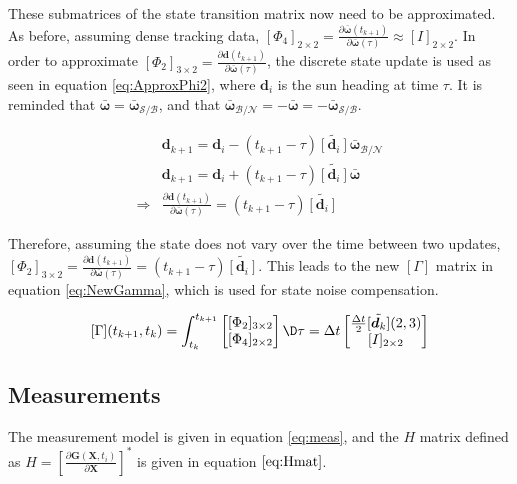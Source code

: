 \documentclass[]{BasiliskReportMemo}
\begin{document}
These submatrices of the state transition matrix now need to be approximated. As before, assuming dense tracking data, $[\Phi_4]_{2 \times 2} =   \frac{\partial \bar{\bm \omega}(t_{k+1})}{\partial \bar{\bm \omega}(\tau)} \approx [I]_{2\times 2}$. 
In order to approximate $[\Phi_2]_{3 \times 2}= \frac{\partial \bm d (t_{k+1})}{\partial \bar{\bm \omega}(\tau)}$, the discrete state update is used as seen in equation \eqref{eq:ApproxPhi2}, where $\bm d_i$ is the sun heading at time $\tau$. It is reminded that $\bar{\bm \omega} = \bar{\bm \omega}_{\mathcal{S}/ \mathcal{B}}$, and that $\bar{\bm \omega}_{\mathcal{B}/ \mathcal{N}} = - \bar{\bm \omega} = -\bar{\bm \omega}_{\mathcal{S}/ \mathcal{B}}$.

\begin{align}\label{eq:ApproxPhi2}
&\bm d_{k+1} = \bm d_i - (t_{k+1} - \tau) \tilde{[\bm d_i]} \bar{\bm \omega}_{\mathcal{B}/ \mathcal{N}} \\
&\bm d_{k+1} = \bm d_i + (t_{k+1} - \tau) \tilde{[\bm d_i]} \bar{\bm \omega} \\
\Rightarrow &  \frac{\partial \bm d (t_{k+1})}{\partial \bar{\bm \omega}(\tau)} =  (t_{k+1} - \tau) \tilde{[\bm d_i]}
\end{align}

Therefore, assuming the state does not vary over the time between two updates,  $[\Phi_2]_{3 \times 2}= \frac{\partial \bm d (t_{k+1})}{\partial \bar{\bm \omega}(\tau)}=   (t_{k+1} - \tau) \tilde{[\bm d_i]}$. This leads to the new $[\Gamma]$ matrix in equation \eqref{eq:NewGamma}, which is used for state noise compensation.

\begin{equation}\label{eq:NewGamma}
[\Gamma](t_{k+1}, t_k) = \int_{t_k}^{t_{k+1}}  \begin{bmatrix} [\Phi_2]_{3 \times 2} \\    [\Phi_4]_{2 \times 2}\end{bmatrix} \D \tau = \Delta t \begin{bmatrix} \frac{\Delta t}{2}\tilde{[\bm d_k]} (2,3)\\ [I]_{2 \times 2}\end{bmatrix}
\end{equation}

 \subsection{Measurements}
 
The measurement model is given in equation \ref{eq:meas}, and the $H$ matrix defined as $H = \left[\frac{\partial \bm G (\bm X, t_i)}{\partial \bm X}\right]^{*}$ is given in equation $\ref{eq:Hmat}$. 
\end{document}
